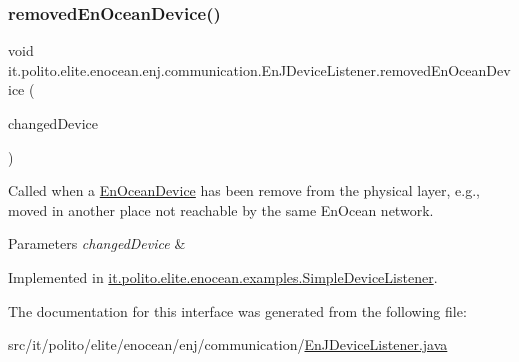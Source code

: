 \subsubsection{\texorpdfstring{removed\+En\+Ocean\+Device()}{removedEnOceanDevice()}}
{\footnotesize\ttfamily void it.\+polito.\+elite.\+enocean.\+enj.\+communication.\+En\+J\+Device\+Listener.\+removed\+En\+Ocean\+Device (\begin{DoxyParamCaption}\item[{\hyperlink{classit_1_1polito_1_1elite_1_1enocean_1_1enj_1_1model_1_1_en_ocean_device}{En\+Ocean\+Device}}]{changed\+Device }\end{DoxyParamCaption})}

Called when a \hyperlink{}{En\+Ocean\+Device} has been remove from the physical layer, e.\+g., moved in another place not reachable by the same En\+Ocean network.


\begin{DoxyParams}{Parameters}
{\em changed\+Device} & \\
\hline
\end{DoxyParams}


Implemented in \hyperlink{classit_1_1polito_1_1elite_1_1enocean_1_1examples_1_1_simple_device_listener_a7bc702e3f0f7175e052af6fddb39fe83}{it.\+polito.\+elite.\+enocean.\+examples.\+Simple\+Device\+Listener}.



The documentation for this interface was generated from the following file\+:\begin{DoxyCompactItemize}
\item 
src/it/polito/elite/enocean/enj/communication/\hyperlink{_en_j_device_listener_8java}{En\+J\+Device\+Listener.\+java}\end{DoxyCompactItemize}

